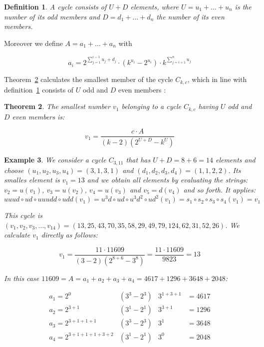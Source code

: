 \documentclass[12pt]{amsart}
\newtheorem{theorem}{Theorem}[section]
\newtheorem{definition}[theorem]{Definition}
\newtheorem{example}[theorem]{Example}
\theoremstyle{definition}
\begin{document}
\begin{definition}
\label{def:odd_even_elements}
A cycle consists of $U+D$ elements, where $U=u_1+\ldots+u_n$ is the number of its odd members and $D=d_1+\ldots+d_n$ the number of its even members.
\end{definition}

\par\noindent
Moreover we define $A=a_1+\ldots+a_n$ with

\[
a_i=2^{\sum_{j=1}^{i-1}u_j+d_j}\cdot\left(k^{u_i}-2^{u_i}\right)\cdot k^{\sum_{j=i+1}^{n}u_j}
\]

\par\medskip\noindent
Theorem~\ref{theo:v0} calculates the smallest member of the cycle $C_{k,c}$, which in line with definition~\ref{def:odd_even_elements} consists of $U$ odd and $D$ even members \cite{Ref_Gupta_2020}:

\begin{theorem}
\label{theo:v0}
The smallest number $v_1$ belonging to a cycle $C_{k,c}$ having $U$ odd and $D$ even members is:

\[
v_1=\frac{c\cdot A}{(k-2)(2^{U+D}-k^U)}
\]
\end{theorem}

\par\medskip
\begin{example}
We consider a cycle $C_{3,11}$ that has $U+D=8+6=14$ elements and choose $(u_1,u_2,u_3,u_4)=(3,1,3,1)$ and $(d_1,d_2,d_3,d_4)=(1,1,2,2)$. Its smalles element is $v_1=13$ and we obtain all elements by evaluating the strings: $v_2=u(v_1)$, $v_3=u(v_2)$, $v_4=u(v_3)$ and $v_5=d(v_4)$ and so forth. It applies:
\[
uuud\circ ud\circ uuudd\circ udd(v_1)=u^3d\circ ud\circ u^3d^2\circ ud^2(v_1)=s_1\circ s_2\circ s_3\circ s_4(v_1)=v_1
\]

\par\noindent
This cycle is $(v_1,v_2,v_3,\ldots,v_{14})=(13,25,43,70,35,58,29,49,79,124,62,31,52,26)$. We calculate $v_1$ directly as follows:

\[
v_1=\frac{11\cdot 11609}{(3-2)(2^{8+6}-3^8)}=\frac{11\cdot11609}{9823}=13
\]

\par\noindent
In this case $11609=A=a_1+a_2+a_3+a_4=4617+1296+3648+2048$:

\[
\begin{array}{llll}
a_1=2^{0}&(3^3-2^3)&3^{1+3+1}&=4617\\
a_2=2^{3+1}&(3^1-2^1)&3^{3+1}&=1296\\
a_3=2^{3+1+1+1}&(3^3-2^3)&3^{1}&=3648\\
a_4=2^{3+1+1+1+3+2}&(3^1-2^1)&3^{0}&=2048
\end{array}
\]
\end{example}
\end{document}
